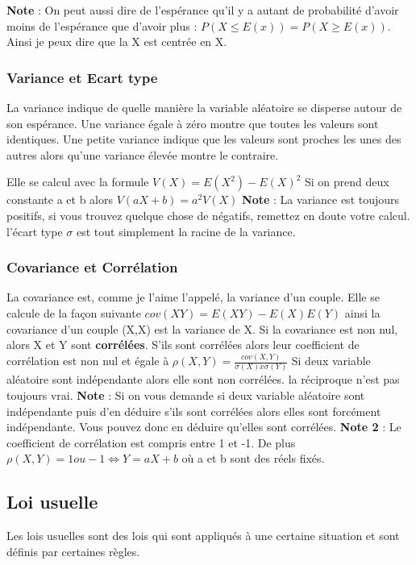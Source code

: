 \documentclass[a4paper]{article}
\begin{document}
\textbf{Note} : On peut aussi dire de l'espérance qu'il y a autant de probabilité d'avoir moins de l'espérance que d'avoir plus : $P(X \leq E(x)) = P(X \geq E(x))$. Ainsi je peux dire que la X est centrée en X. 


\subsubsection{Variance et Ecart type}
 
 La variance indique de quelle manière la variable aléatoire se disperse autour de son espérance. Une variance égale à zéro montre que toutes les valeurs sont identiques. Une petite variance indique que les valeurs sont proches les unes des autres alors qu'une variance élevée montre le contraire.
 
 Elle se calcul avec la formule $V(X) = E(X^2) - E(X)^2$\newline
 Si on prend deux constante a et b alors $V(aX+b) = a^2 V(X)$ \newline
 \textbf{Note} : La variance est toujours positifs, si vous trouvez quelque chose de négatifs, remettez en doute votre calcul. \newline
 l'écart type $\sigma$ est tout simplement la racine de la variance.
 \subsubsection{Covariance et Corrélation}
 
 La covariance est, comme je l'aime l'appelé, la variance d'un couple. Elle se calcule de la façon suivante   $cov(XY) = E(XY) - E(X)E(Y)$ ainsi la covariance d'un couple (X,X) est la variance de X. \newline
 Si la covariance est non nul, alors X et Y sont \textbf{corrélées}.
 S'ils sont corrélées alors leur coefficient de corrélation est non nul et égale à $\rho (X,Y) =\frac{cov(X,Y)}{\sigma (X)x\sigma (Y)}$ \newline
 Si deux variable aléatoire sont indépendante alors elle sont non corrélées. la réciproque n'est pas toujours vrai. \newline
 \textbf{Note} : Si on vous demande si deux variable aléatoire sont indépendante puis d'en déduire s'ils sont corrélées alors elles sont forcément indépendante. Vous pouvez donc en déduire qu'elles sont corrélées.
 \textbf{Note 2} : Le coefficient de corrélation est compris entre 1 et -1. De plus $\rho (X,Y) = 1 ou -1 \Leftrightarrow Y = aX + b$ où a et b sont des réels fixés.
\subsection{Loi usuelle}
Les lois usuelles sont des lois qui sont appliqués à une certaine situation et sont définis par certaines règles.
\end{document}
